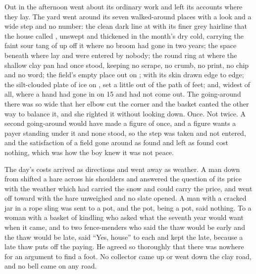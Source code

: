 Out in  the afternoon went about its ordinary work and left its accounts where they lay. The yard went around its seven walked-around places with a look and a wide step and no number: the clean dark line at  with its finer grey hairline that the house called , unswept and thickened in the month's dry cold, carrying the faint sour tang of  up off it where no broom had gone in two years; the space beneath  where  lay and were entered by nobody; the round ring at  where the shallow clay pan had once stood, keeping no scrape, no crumb, no print, no chip and no word; the field's empty place out on ;  with its skin drawn edge to edge; the silt-clouded plate of ice on , set a little out of the path of feet; and, widest of all,  where a hand had gone in on  15 and had not come out. The going-around there was so wide that her elbow cut the corner and the basket canted the other way to balance it, and she righted it without looking down. Once. Not twice. A second going-around would have made a figure of once, and a figure wants a payer standing under it and none stood, so the step was taken and not entered, and the satisfaction of a field gone around as found and left as found cost nothing, which was how the boy knew it was not peace.

\scenebreak

The day's costs arrived as directions and went away as weather. A man down from  shifted a hare across his shoulders and answered the question of its price with the weather which had carried the snow and could carry the price, and went off toward  with the hare unweighed and no slate opened. A man with a cracked jar in a rope sling was sent to a pot, and the pot, being a pot, said nothing. To a woman with a basket of kindling who asked what the seventh year would want when it came, and to two fence-menders who said the thaw would be early and the thaw would be late,  said “Yes, house” to each and kept the late, because a late thaw puts off the paying. He agreed so thoroughly that there was nowhere for an argument to find a foot. No collector came up or went down the clay road, and no bell came on any road.

